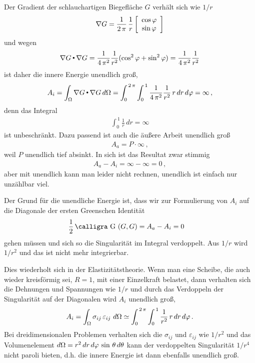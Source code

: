 {{{{{Der Gradient der schlauchartigen Biegefl\"{a}che $G$ verh\"{a}lt sich wie $1/r$
\begin{align}
\nabla G = \frac{1}{2\,\pi}\,\frac{1}{r} \left[ \barr {c }
      \cos \Np  \\
      \sin \Np
     \earr \right]
\end{align}
und wegen
\begin{align}
\nabla G \dotprod  \nabla G = \frac{1}{4\,\pi^2}\frac{1}{r^2} (\cos^2 \Np + \sin^2 \Np) = \frac{1}{4\,\pi^2}\frac{1}{r^2}
\end{align}
ist daher die innere Energie unendlich gro{\ss},
\begin{align}
A_i = \int_{\Omega} \nabla G \dotprod \nabla G \,d\Omega = \int_0^{\,2\,\pi} \int_0^{\,1} \frac{1}{4\,\pi^2}\frac{1}{r^2}\,r\,dr\,d\Np = \infty\,,
\end{align}
denn das Integral
\begin{align}
\int_0^{\,1} \frac{1}{r}\,dr = \infty
\end{align}
ist unbeschr\"{a}nkt. Dazu passend ist auch die \"{a}u{\ss}ere Arbeit unendlich gro{\ss}
\begin{align}
A_a = P \cdot \infty\,,
\end{align}
weil $P$ unendlich tief absinkt. In sich ist das Resultat zwar stimmig
\begin{align}
A_a - A_i = \infty - \infty = 0\,,
\end{align}
aber mit unendlich kann man leider nicht rechnen, unendlich ist einfach nur \glq unz\"{a}hlbar viel\grq{}.

Der Grund f\"{u}r die unendliche Energie ist, dass wir zur Formulierung von $A_i$ auf die Diagonale
der ersten Greenschen Identit\"{a}t
\begin{align}
\frac{1}{2}\, \text{\normalfont\calligra G\,\,}(G, G) &= A_a - A_i = 0
\end{align}
gehen m\"{u}ssen und sich so die Singularit\"{a}t im Integral verdoppelt. Aus $1/r$ wird $1/r^2$ und das ist nicht mehr integrierbar.

Dies wiederholt sich in der Elastizit\"{a}tstheorie. Wenn man eine Scheibe, die auch wieder kreisf\"{o}rmig sei, $R = 1$, mit einer Einzelkraft belastet, dann verhalten sich die Dehnungen und Spannungen wie $1/r$ und durch das Verdoppeln der Singularit\"{a}t auf der Diagonalen wird $A_i$ unendlich gro{\ss},
\begin{align}
A_i = \int_{\Omega} \sigma_{ij}\,\varepsilon_{ij}\,\,d\Omega \simeq \int_0^{\,2\,\pi} \int_0^{\,1} \frac{1}{r^2}\,r\,dr\,d\Np\,.
\end{align}
Bei dreidimensionalen Problemen verhalten sich die $\sigma_{ij}$ und $\varepsilon_{ij}$ wie $1/r^2$ und das Volumenelement $d\Omega = r^2\,dr\,d\Np\,\sin\,\theta\,d\theta$ kann der verdoppelten Singularit\"{a}t $1/r^4$ nicht paroli bieten, d.h. die innere Energie ist dann ebenfalls unendlich gro{\ss}.

}}}}}
